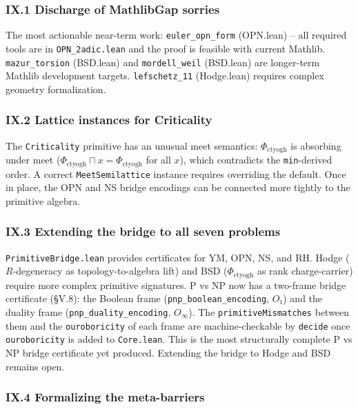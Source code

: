 \documentclass[12pt,a4paper]{article}
\newcommand{\pilcrow}{\S}
\begin{document}
\subsubsection{IX.1 Discharge of MathlibGap sorries}

The most actionable near-term work: \texttt{euler\_opn\_form} (OPN.lean)  --  all required tools are in \texttt{OPN\_2adic.lean} and the proof is feasible with current Mathlib. \texttt{mazur\_torsion} (BSD.lean) and \texttt{mordell\_weil} (BSD.lean) are longer-term Mathlib development targets. \texttt{lefschetz\_11} (Hodge.lean) requires complex geometry formalization.

\subsubsection{IX.2 Lattice instances for Criticality}

The \texttt{Criticality} primitive has an unusual meet semantics: $\Phi_{\text{ctyogh}}$ is absorbing under meet ($\Phi_{\text{ctyogh}} \sqcap x = \Phi_{\text{ctyogh}}$ for all $x$), which contradicts the \texttt{min}-derived order. A correct \texttt{MeetSemilattice} instance requires overriding the default. Once in place, the OPN and NS bridge encodings can be connected more tightly to the primitive algebra.

\subsubsection{IX.3 Extending the bridge to all seven problems}

\texttt{PrimitiveBridge.lean} provides certificates for YM, OPN, NS, and RH. Hodge ($R$-degeneracy as topology-to-algebra lift) and BSD ($\Phi_{\text{ctyogh}}$ as rank charge-carrier) require more complex primitive signatures. P vs NP now has a two-frame bridge certificate (\pilcrow{}V.8): the Boolean frame (\texttt{pnp\_boolean\_encoding}, $O₁$) and the duality frame (\texttt{pnp\_duality\_encoding}, $O_{\infty}$). The \texttt{primitiveMismatches} between them and the \texttt{ouroboricity} of each frame are machine-checkable by \texttt{decide} once \texttt{ouroboricity} is added to \texttt{Core.lean}. This is the most structurally complete P vs NP bridge certificate yet produced. Extending the bridge to Hodge and BSD remains open.

\subsubsection{IX.4 Formalizing the meta-barriers}
\end{document}

